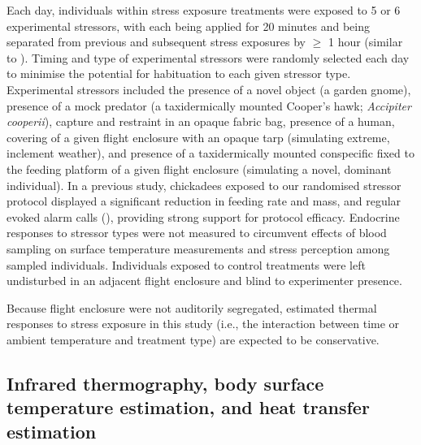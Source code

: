 \documentclass[12pt]{article}
\begin{document}
\noindent Each day, individuals within stress exposure treatments were exposed to 5 or 6 experimental stressors, with each being applied for 20 minutes and being separated from previous and subsequent stress exposures by $\geq$ 1 hour (similar to \citealt{rich_2005}). Timing and type of experimental stressors were randomly selected each day to minimise the potential for habituation to each given stressor type. Experimental stressors included the presence of a novel object (a garden gnome), presence of a mock predator (a taxidermically mounted Cooper's hawk; \textit{Accipiter cooperii}), capture and restraint in an opaque fabric bag, presence of a human, covering of a given flight enclosure with an opaque tarp (simulating extreme, inclement weather), and presence of a taxidermically mounted conspecific fixed to the feeding platform of a given flight enclosure (simulating a novel, dominant individual). In a previous study, chickadees exposed to our randomised stressor protocol displayed a significant reduction in feeding rate and mass, and regular evoked alarm calls (\citealt{robertson_2020b}), providing strong support for protocol efficacy. Endocrine responses to stressor types were not measured to circumvent effects of blood sampling on surface temperature measurements and stress perception among sampled individuals. Individuals exposed to control treatments were left undisturbed in an adjacent flight enclosure and blind to experimenter presence. \vspace{1cm}    

\noindent Because flight enclosure were not auditorily segregated, estimated thermal responses to stress exposure in this study (i.e., the interaction between time or ambient temperature and treatment type) are expected to be conservative. \vspace{0.5cm}

\subsection{Infrared thermography, body surface temperature estimation, and heat transfer estimation}
\vspace{0.5cm}
\end{document}
